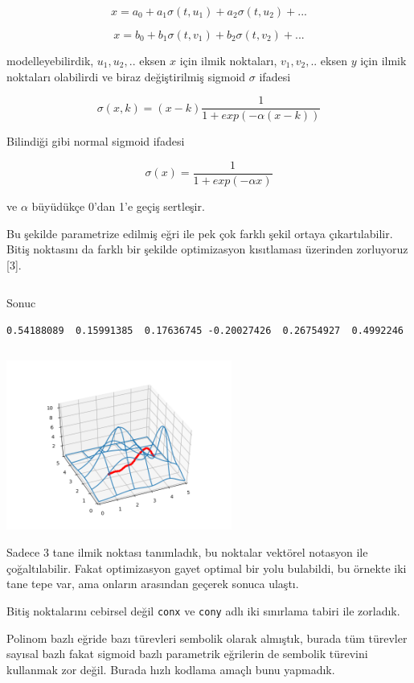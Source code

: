 \documentclass[12pt,fleqn]{article}\usepackage{../../common}
\begin{document}
$$
x = a_0 + a_1 \sigma(t,u_1) + a_2 \sigma(t,u_2) + ... 
$$

$$
x = b_0 + b_1 \sigma(t,v_1) + b_2 \sigma(t,v_2) + ... 
$$

modelleyebilirdik, $u_1,u_2,..$ eksen $x$ için ilmik noktaları,
$v_1,v_2,..$ eksen $y$ için ilmik noktaları olabilirdi ve biraz
değiştirilmiş sigmoid $\sigma$ ifadesi

$$
\sigma (x,k) = (x-k) \frac{1}{1 + exp(-\alpha (x-k))}
$$

Bilindiği gibi normal sigmoid ifadesi

$$
\sigma (x) = \frac{1}{1 + exp(-\alpha x)}
$$

ve $\alpha$ büyüdükçe 0'dan 1'e geçiş sertleşir. 

Bu şekilde parametrize edilmiş eğri ile pek çok farklı şekil ortaya
çıkartılabilir. Bitiş noktasını da farklı bir şekilde optimizasyon kısıtlaması
üzerinden zorluyoruz [3].

\inputminted[fontsize=\footnotesize]{python}{paths3.py}

Sonuc

\begin{verbatim}
0.54188089  0.15991385  0.17636745 -0.20027426  0.26754927  0.4992246 
\end{verbatim}

\inputminted[fontsize=\footnotesize]{python}{paths3plot.py}

\includegraphics[width=20em]{calc_multi_40_elev_06.png}

Sadece 3 tane ilmik noktası tanımladık, bu noktalar vektörel notasyon ile
çoğaltılabilir. Fakat optimizasyon gayet optimal bir yolu bulabildi, bu
örnekte iki tane tepe var, ama onların arasından geçerek sonuca ulaştı. 

Bitiş noktalarını cebirsel değil \verb!conx! ve \verb!cony! adlı iki
sınırlama tabiri ile zorladık.

Polinom bazlı eğride bazı türevleri sembolik olarak almıştık, burada
tüm türevler sayısal bazlı fakat sigmoid bazlı parametrik eğrilerin de
sembolik türevini kullanmak zor değil. Burada hızlı kodlama amaçlı bunu
yapmadık. 
\end{document}
